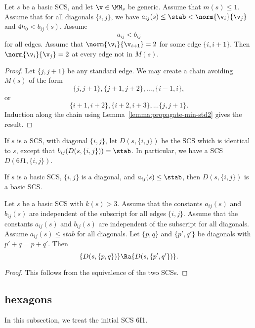 \begin{lemma}\label{lemma:propagate-min-std3}
Let $s$ be a basic SCS, and let $\v\in \MM_s$ be generic.   Assume that $m(s)\le 1$.  
Assume that
for all diagonals $\{i,j\}$, we have
$a_{ij}(s)\le \stab < \norm{\v_i}{\v_j}$ and $4h_0 < b_{ij}(s)$.
Assume
\[
a_{ij} < b_{ij}
\]
for all edges.
Assume that $\norm{\v_i}{\v_{i+1}}=2$ for some edge $\{i,i+1\}$.  
Then $\norm{\v_i}{\v_j}=2$ at every  edge not in $M(s)$.
\end{lemma}

\begin{proof}  Let $\{j,j+1\}$ be any standard edge.  We may create a chain avoiding $M(s)$ of the form
\[
\{j,j+1\}, \{j+1,j+2\},\ldots, \{i-1,i\},
\]
or 
\[
\{i+1,i+2\}, \{i+2,i+3\},\ldots \{j,j+1\}.
\]
Induction along the chain using Lemma~\ref{lemma:propagate-min-std2} gives the result.
\end{proof}


If $s$ is a SCS,
with  diagonal $\{i,j\}$, let $D(s,\{i,j\})$ be the SCS which is identical to $s$, except that
$b_{ij}(D(s,\{i,j\})) =\stab$.   In particular, we have a SCS $D(6I1,\{i,j\})$.

\begin{lemma}
If $s$ is a basic SCS, $\{i,j\}$ is a diagonal, and
$a_{ij}(s)\le\stab$, then $D(s,\{i,j\})$ is a basic SCS.
\end{lemma}


\begin{lemma}\label{lemma:equivalent-diagonal}
Let $s$ be a basic SCS with $k(s)>3$.  
Assume that the constants $a_{ij}(s)$ and $b_{ij}(s)$ are independent of
the subscript for all edges $\{i,j\}$.  Assume that the constants
$a_{ij}(s)$ and $b_{ij}(s)$ are independent of the subscript for all diagonals.
Assume $a_{ij}(s)\le stab$ for all diagonals.
Let $\{p,q\}$ and $\{p',q'\}$ be diagonals with $p'+q = p+q'$.
Then
\[
\{D(s,\{p,q\})\} \Ra \{D(s,\{p',q'\})\}.
\]
\end{lemma}

\begin{proof}  This follows from the equivalence of the two SCSs.
\end{proof}

\subsection{hexagons}

In this subsection, we treat the initial SCS 6I1.




